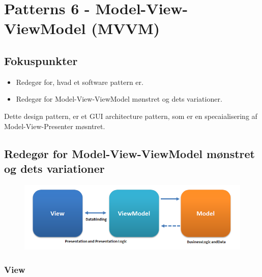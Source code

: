 \section{Patterns 6 - Model-View-ViewModel (MVVM)}

\subsection{Fokuspunkter}

\begin{itemize}
	\item Redegør for, hvad et software pattern er.
	\item Redegør for Model-View-ViewModel mønstret og dets variationer.
\end{itemize}



Dette design pattern, er et GUI architecture pattern, som er en specaialisering af Model-View-Presenter møsntret.

\subsection{Redegør for Model-View-ViewModel mønstret og dets variationer}

\begin{figure}[h]
\centering
\includegraphics[width=0.7\linewidth]{figs/MVVM/MVVMPattern.png}
\caption[Sammenhæng mellem Model-View-ViewModel]{}
\caption{}
\label{fig:MVVMPattern}
\end{figure}

\subsubsection{View}

